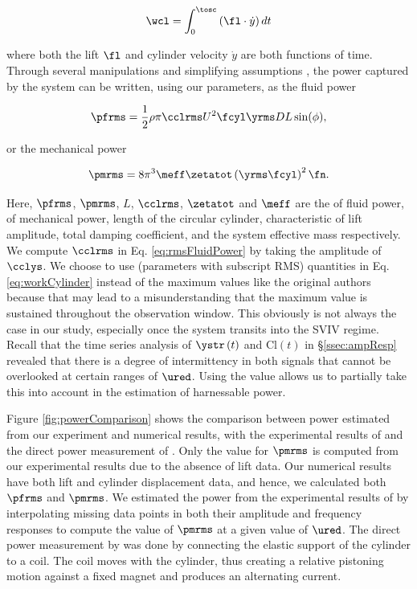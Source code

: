 \documentclass[a4paper,fleqn]{cas-sc}
\begin{document}
\begin{equation}
  \wcl = \int_{0}^{\tosc} \left ( \fl \cdot \dot{y} \right ) dt
  \label{eq:workCylinder}
\end{equation}

\noindent where both the lift $\fl$ and cylinder velocity $\dot{y}$ are both functions of time. Through several manipulations and simplifying assumptions \citep{Sun2016}, the power captured by the system can be written, using our parameters, as the fluid power

\begin{equation}
  \pfrms = \frac{1}{2} \rho \pi \cclrms U^{2} \fcyl \yrms D L \sin(\phi),
  \label{eq:rmsFluidPower}
\end{equation}

\noindent or the mechanical power

\begin{equation}
  \pmrms = 8 \pi^{3} \meff \zetatot \left (\yrms \fcyl \right )^{2} \fn.
  \label{eq:rmsMechPower}
\end{equation}

Here, $\pfrms$, $\pmrms$, $L$, $\cclrms$, $\zetatot$ and $\meff$ are the \rms{} of fluid power, \rms{} of mechanical power, length of the circular cylinder, characteristic \rms{} of lift amplitude, total damping coefficient, and the system effective mass respectively. We compute $\cclrms$ in Eq. \ref{eq:rmsFluidPower} by taking the \rms{} amplitude of $\cclys$. We choose to use \rms{} (parameters with subscript RMS) quantities in Eq. \ref{eq:workCylinder} instead of the maximum values like the original authors because that may lead to a misunderstanding that the maximum value is sustained throughout the observation window. This obviously is not always the case in our study, especially once the system transits into the SVIV regime. Recall that the time series analysis of $\ystr\left( t \right)$ and $\text{Cl}\left( t \right)$ in \S\ref{ssec:ampResp} revealed that there is a degree of intermittency in both signals that cannot be overlooked at certain ranges of $\ured$. Using the \rms{} value allows us to partially take this into account in the estimation of harnessable power.

Figure \ref{fig:powerComparison} shows the comparison between power estimated from our experiment and numerical results, with the experimental results of \citet{Nguyen2012} and the direct power measurement of \citet{Koide2013}. Only the value for $\pmrms$ is computed from our experimental results due to the absence of lift data. Our numerical results have both lift and cylinder displacement data, and hence, we calculated both $\pfrms$ and $\pmrms$. We estimated the power from the experimental results of \citet{Nguyen2012} by interpolating missing data points in both their amplitude and frequency responses to compute the value of $\pmrms$ at a given value of $\ured$. The direct power measurement by \citet{Koide2013} was done by connecting the elastic support of the cylinder to a coil. The coil moves with the cylinder, thus creating a relative pistoning motion against a fixed magnet and produces an alternating current.
\end{document}
